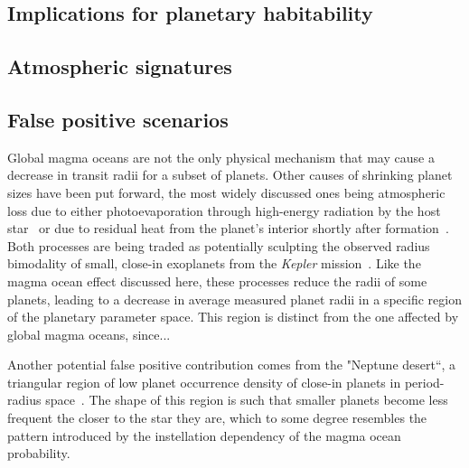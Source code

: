 \documentclass[modern]{aastex631}
\begin{document}
\subsection{Implications for planetary habitability}\label{sec:habitability}

\subsection{Atmospheric signatures}

\subsection{False positive scenarios}
\begin{note}
Global magma oceans are not the only physical mechanism that may cause a decrease in transit radii for a subset of planets.
Other causes of shrinking planet sizes have been put forward, the most widely discussed ones being atmospheric loss due to either photoevaporation through high-energy radiation by the host star~\citep[e.g.,][]{Owen2013,Jin2014,Mordasini2020a} or due to residual heat from the planet's interior shortly after formation~\citep{Ginzburg2016b,Ginzburg2018,Gupta2019}.
    Both processes are being traded as potentially sculpting the observed radius bimodality of small, close-in exoplanets from the \textit{Kepler} mission~\citep{Fulton2017,VanEylen2018}.
    Like the magma ocean effect discussed here, these processes reduce the radii of some planets, leading to a decrease in average measured planet radii in a specific region of the planetary parameter space.
    This region is distinct from the one affected by global magma oceans, since... 

    Another potential false positive contribution comes from the "Neptune desert``, a triangular region of low planet occurrence density of close-in planets in period-radius space~\citep{Szabo2011,Mazeh2016,Dreizler2020b}.
    The shape of this region is such that smaller planets become less frequent the closer to the star they are, which to some degree resembles the pattern introduced by the instellation dependency of the magma ocean probability.
\end{note}
\end{document}
